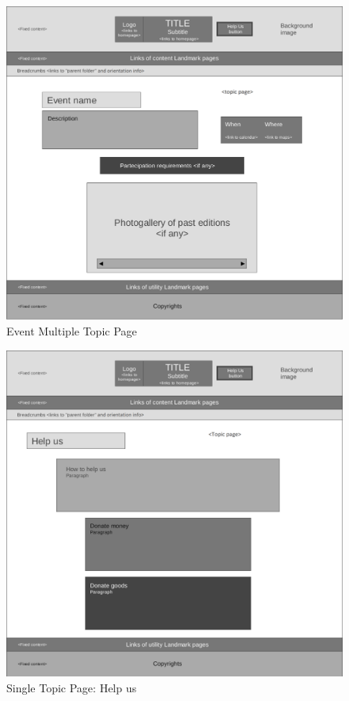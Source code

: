 \begin{figure}[h]
\includegraphics[width=1.3\textwidth, center]{MainMatter/images/9-Multiple-topic-Event}
\caption{Event Multiple Topic Page}
\label{fig:figure2}
\end{figure}
%
\begin{figure}[h]
\includegraphics[width=1.3\textwidth, center]{MainMatter/images/10-Single-topic-help-us}
\caption{Single Topic Page: Help us}
\label{fig:figure2}
\end{figure}
%
%
